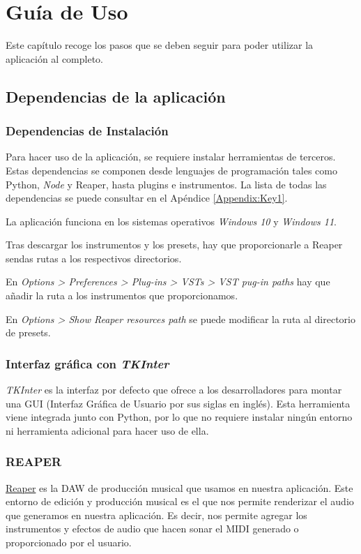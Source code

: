 \chapter{Guía de Uso}
\label{cap:descripcionTrabajo}
\label{cap:manualUsuario}

Este capítulo recoge los pasos que se deben seguir para poder utilizar la aplicación al completo.

\section{Dependencias de la aplicación}
\label{sec:dependeciasApp}
\subsection{Dependencias de Instalación}
	
	Para hacer uso de la aplicación, se requiere instalar herramientas de terceros. Estas dependencias se componen desde lenguajes de programación tales como Python, \textit{Node} y Reaper, hasta plugins e instrumentos. La lista de todas las dependencias se puede consultar en el Apéndice \ref{Appendix:Key1}.

    La aplicación funciona en los sistemas operativos \textit{Windows 10} y \textit{Windows 11}.

    Tras descargar los instrumentos y los presets, hay que proporcionarle a Reaper sendas rutas a los respectivos directorios.

    En \textit{Options > Preferences > Plug-ins > VSTs > VST pug-in paths} hay que añadir la ruta a los instrumentos que proporcionamos.

    En \textit{Options > Show Reaper resources path} se puede modificar la ruta al directorio de presets.

\subsection{Interfaz gráfica con \textit{TKInter}}
	\textit{TKInter} es la interfaz por defecto que \PythonLink{} ofrece a los desarrolladores para montar una 
    GUI (Interfaz Gráfica de Usuario por sus siglas en inglés).
	Esta herramienta viene integrada junto con Python, por lo que no requiere instalar ningún entorno ni herramienta adicional para hacer uso de ella.

\subsection{REAPER}
\label{subsec:manual-reaper}
	\href{https://www.reaper.fm/}{Reaper} es la DAW de producción musical que usamos en nuestra aplicación. Este entorno de edición y producción musical es el que nos permite renderizar el audio que generamos en nuestra aplicación. Es decir, nos permite agregar los instrumentos y efectos de audio que hacen sonar el MIDI generado o proporcionado por el usuario.
    
